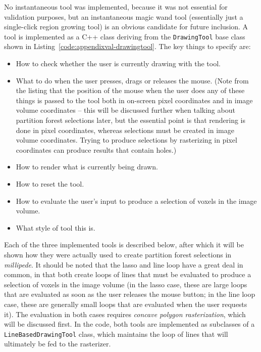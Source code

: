 %
No instantaneous tool was implemented, because it was not essential for validation purposes, but an instantaneous magic wand tool (essentially just a single-click region growing tool) is an obvious candidate for future inclusion. A tool is implemented as a C++ class deriving from the \texttt{DrawingTool} base class shown in Listing~\ref{code:appendixval-drawingtool}. The key things to specify are:

\begin{itemize}

\item How to check whether the user is currently drawing with the tool.
\item What to do when the user presses, drags or releases the mouse. (Note from the listing that the position of the mouse when the user does any of these things is passed to the tool both in on-screen pixel coordinates and in image volume coordinates -- this will be discussed further when talking about partition forest selections later, but the essential point is that rendering is done in pixel coordinates, whereas selections must be created in image volume coordinates. Trying to produce selections by rasterizing in pixel coordinates can produce results that contain holes.)
\item How to render what is currently being drawn.
\item How to reset the tool.
\item How to evaluate the user's input to produce a selection of voxels in the image volume.
\item What style of tool this is.

\end{itemize}
%
Each of the three implemented tools is described below, after which it will be shown how they were actually used to create partition forest selections in \emph{millipede}. It should be noted that the lasso and line loop have a great deal in common, in that both create loops of lines that must be evaluated to produce a selection of voxels in the image volume (in the lasso case, these are large loops that are evaluated as soon as the user releases the mouse button; in the line loop case, these are generally small loops that are evaluated when the user requests it). The evaluation in both cases requires \emph{concave polygon rasterization}, which will be discussed first. In the code, both tools are implemented as subclasses of a \texttt{LineBasedDrawingTool} class, which maintains the loop of lines that will ultimately be fed to the rasterizer.

